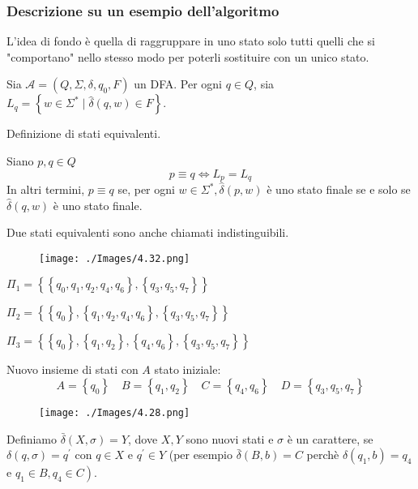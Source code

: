 \subsubsection{Descrizione su un esempio dell'algoritmo}

L'idea di fondo è quella di raggruppare in uno stato solo tutti quelli
che si "comportano" nello stesso modo per poterli sostituire con
un unico stato.

Sia $\mathcal{A}=\left(Q, \Sigma, \delta, q_{0}, F\right)$ un DFA.
Per ogni $q \in Q$, sia $L_{q}=\left\{w \in \Sigma^{*} \mid \hat{\delta}(q, w) \in F\right\}$.


Definizione di stati equivalenti.

Siano $p, q \in Q$
$$
p \equiv q \Leftrightarrow L_{p}=L_{q}
$$
In altri termini, $p \equiv q$ se, per ogni $w \in \Sigma^{*}, \hat{\delta}(p, w)$ è uno stato finale se e solo se $\hat{\delta}(q, w)$ è uno stato finale.

Due stati equivalenti sono anche chiamati indistinguibili.

\begin{figure}[hbpt!]
    \centering
    \texttt{[image: ./Images/4.32.png]}
\end{figure}
\FloatBarrier

$\Pi_{1}=\left\{\left\{q_{0}, q_{1}, q_{2}, q_{4}, q_{6}\right\},\left\{q_{3}, q_{5}, q_{7}\right\}\right\}$

$\Pi_{2}=\left\{\left\{q_{0}\right\},\left\{q_{1}, q_{2}, q_{4}, q_{6}\right\},\left\{q_{3}, q_{5}, q_{7}\right\}\right\}$

$\Pi_{3}=\left\{\left\{q_{0}\right\},\left\{q_{1}, q_{2}\right\},\left\{q_{4}, q_{6}\right\},\left\{q_{3}, q_{5}, q_{7}\right\}\right\}$

\vspace{5mm}

Nuovo insieme di stati con $A$ stato iniziale:
$$
A=\left\{q_{0}\right\} \quad B=\left\{q_{1}, q_{2}\right\} \quad C=\left\{q_{4}, q_{6}\right\} \quad D=\left\{q_{3}, q_{5}, q_{7}\right\}
$$

\begin{figure}[hbpt!]
    \centering
    \texttt{[image: ./Images/4.28.png]}
\end{figure}
\FloatBarrier

Definiamo $\bar{\delta}(X, \sigma)=Y$, dove $X, Y$ sono nuovi stati e $\sigma$ è un carattere, se $\delta(q, \sigma)=q^{\prime}$ con $q \in X$ e $q^{\prime} \in Y$ (per esempio $\bar{\delta}(B, b)=C$ perchè $\delta\left(q_{1}, b\right)=q_{4}$ e $\left.q_{1} \in B, q_{4} \in C\right)$.


